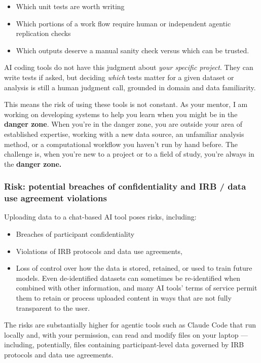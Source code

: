 \documentclass[
]{book}
\providecommand{\tightlist}{%
  \setlength{\itemsep}{0pt}\setlength{\parskip}{0pt}}
\begin{document}
\begin{itemize}
\tightlist
\item
  Which unit tests are worth writing
\item
  Which portions of a work flow require human or independent agentic
  replication checks
\item
  Which outputs deserve a manual sanity check versus which can be
  trusted.
\end{itemize}

AI coding tools do not have this judgment about \emph{your specific project}.
They can write tests if asked, but deciding \emph{which} tests matter for a
given dataset or analysis is still a human judgment call, grounded in
domain and data familiarity.

This means the risk of using these tools is not constant. As your
mentor, I am working on developing systems to help you learn when you
might be in the \textbf{danger zone}. When you're in the danger zone, you are
outside your area of established expertise, working with a new data
source, an unfamiliar analysis method, or a computational workflow you
haven't run by hand before. The challenge is, when you're new to a
project or to a field of study, you're always in the \textbf{danger zone.}

\subsubsection{Risk: potential breaches of confidentiality and IRB / data use agreement violations}\label{risk-potential-breaches-of-confidentiality-and-irb-data-use-agreement-violations}

Uploading data to a chat-based AI tool poses risks, including:

\begin{itemize}
\tightlist
\item
  Breaches of participant confidentiality
\item
  Violations of IRB protocols and data use agreements,
\item
  Loss of control over how the data is stored, retained, or used to train future models. Even de-identified datasets can
  sometimes be re-identified when combined with other information, and
  many AI tools' terms of service permit them to retain or process
  uploaded content in ways that are not fully transparent to the user.
\end{itemize}

The risks are substantially higher for agentic tools such as Claude Code
that run locally and, with your permission, can read and modify files on
your laptop --- including, potentially, files containing participant-level
data governed by IRB protocols and data use agreements.
\end{document}
